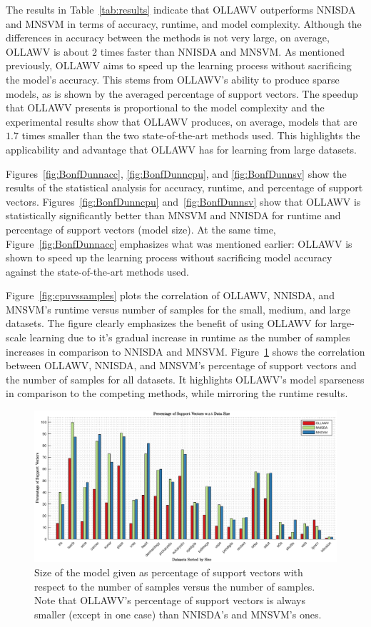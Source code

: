 \documentclass[reqno]{vcuthesis}
\numberwithin{equation}{chapter}
\begin{document}
The results in Table~\ref{tab:results} indicate that OLLAWV outperforms NNISDA and MNSVM in terms of accuracy, runtime, and model complexity. Although the differences in accuracy between the methods is not very large, on average, OLLAWV is about $2$ times faster than NNISDA and MNSVM. As mentioned previously, OLLAWV aims to speed up the learning process without sacrificing the model's accuracy. This stems from OLLAWV's ability to produce sparse models, as is shown by the averaged percentage of support vectors. The speedup that OLLAWV presents is proportional to the model complexity and the experimental results show that OLLAWV produces, on average, models that are $1.7$ times smaller than the two state-of-the-art methods used. This highlights the applicability and advantage that OLLAWV has for learning from large datasets. 

Figures~\ref{fig:BonfDunnacc}, \ref{fig:BonfDunncpu}, and \ref{fig:BonfDunnsv} show the results of the statistical analysis for accuracy, runtime, and percentage of support vectors. Figures~\ref{fig:BonfDunncpu} and~\ref{fig:BonfDunnsv} show that OLLAWV is statistically significantly better than MNSVM and NNISDA for runtime and percentage of support vectors (model size). At the same time, Figure~\ref{fig:BonfDunnacc} emphasizes what was mentioned earlier: OLLAWV is shown to speed up the learning process without sacrificing model accuracy against the state-of-the-art methods used. 

Figure~\ref{fig:cpuvssamples} plots the correlation of OLLAWV, NNISDA, and MNSVM's runtime versus number of samples for the small, medium, and large datasets. The figure clearly emphasizes the benefit of using OLLAWV for large-scale learning due to it's gradual increase in runtime as the number of samples increases in comparison to NNISDA and MNSVM. Figure~\ref{fig:psvvssamples} shows the correlation between OLLAWV, NNISDA, and MNSVM's percentage of support vectors and the number of samples for all datasets. It highlights OLLAWV's model sparseness in comparison to the competing methods, while mirroring the runtime results. 

\begin{figure}
\centering
\includegraphics[trim={3.2cm 0 3.2cm 0},clip,width=\textwidth]{figures/PSV_vs_NumData.eps}
\caption{Size of the model given as percentage of support vectors with respect to the number of samples  versus the number of samples. Note that OLLAWV’s percentage of support vectors is always smaller (except in one case) than NNISDA's and MNSVM's ones.}
\label{fig:psvvssamples}
\end{figure}
\end{document}
